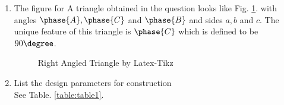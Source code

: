 \renewcommand{\theequation}{\theenumi}
\begin{enumerate}[label=\thesection.\arabic*.,ref=\thesection.\theenumi]
\item The figure for A triangle obtained in the question looks like Fig. \ref{fig:tri_right_angle}.
with angles $\phase{ A},\phase{ C}$ and $\phase{ B}$ and sides $a, b$ and $c$.  The unique feature of this triangle is $\phase{ C}$ which is defined to be $90\degree$.


\begin{figure}[!ht]
\centering
\resizebox{\columnwidth}{!}{}
\caption{Right Angled Triangle by Latex-Tikz}
\label{fig:tri_right_angle}	
\end{figure}
%
%
%
\item List the design parameters for construction
\label{const:table1}
\\
\solution See Table. \ref{table:table1}. 
%
\begin{table}[ht!]
\centering

\caption{To construct $\triangle ACB$}
\label{table:table1}	
\end{table}


\end{enumerate}
